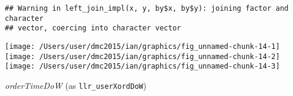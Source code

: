 \documentclass[10pt]{report}
\newenvironment{Shaded}{}{}
\newcommand{\KeywordTok}[1]{\textcolor[rgb]{0.00,0.44,0.13}{\textbf{{#1}}}}
\newcommand{\DataTypeTok}[1]{\textcolor[rgb]{0.56,0.13,0.00}{{#1}}}
\newcommand{\StringTok}[1]{\textcolor[rgb]{0.25,0.44,0.63}{{#1}}}
\newcommand{\NormalTok}[1]{{#1}}
\begin{document}
\begin{Shaded}
\end{Shaded}

\begin{verbatim}
## Warning in left_join_impl(x, y, by$x, by$y): joining factor and character
## vector, coercing into character vector
\end{verbatim}

\begin{Shaded}
\end{Shaded}

\begin{center}\texttt{[image: /Users/user/dmc2015/ian/graphics/fig\_unnamed-chunk-14-1]} \texttt{[image: /Users/user/dmc2015/ian/graphics/fig\_unnamed-chunk-14-2]} \texttt{[image: /Users/user/dmc2015/ian/graphics/fig\_unnamed-chunk-14-3]} \end{center}

\emph{orderTimeDoW} (as \texttt{llr\_userXordDoW})
\end{document}
